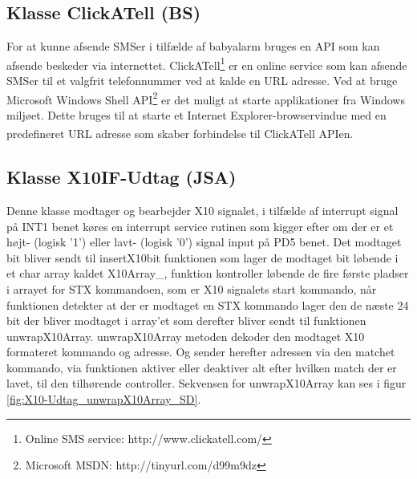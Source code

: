 \subsection{Klasse ClickATell (BS)}
For at kunne afsende SMSer i tilfælde af babyalarm bruges en API som kan afsende beskeder via internettet.
ClickATell\textsuperscript{\circledR}\footnote{Online SMS service: http://www.clickatell.com/} er en online service som kan afsende SMSer til et valgfrit telefonnummer ved at kalde en URL adresse.
Ved at bruge Microsoft Windows Shell API\footnote{Microsoft MSDN: http://tinyurl.com/d99m9dz} er det muligt at starte applikationer fra Windows miljøet. Dette bruges til at starte et Internet Explorer-browservindue med en predefineret URL adresse som skaber forbindelse til ClickATell\textsuperscript{\circledR} APIen. 

\subsection{Klasse X10IF-Udtag (JSA)}
Denne klasse modtager og bearbejder X10 signalet, i tilfælde af interrupt signal på INT1 benet køres en interrupt service rutinen som kigger efter om der er et højt- (logisk '1') eller lavt- (logisk '0') signal input på PD5 benet. Det modtaget bit bliver sendt til insertX10bit funktionen som lager de modtaget bit løbende i et char array kaldet X10Array\_, funktion kontroller løbende de fire første pladser i arrayet for STX kommandoen, som er X10 signalets start kommando, når funktionen detekter at der er modtaget en STX kommando lager den de næste 24 bit der bliver modtaget i array'et som derefter bliver sendt til funktionen unwrapX10Array. unwrapX10Array metoden dekoder den modtaget X10 formateret kommando og adresse. Og sender herefter adressen via den matchet kommando, via funktionen aktiver eller deaktiver alt efter hvilken match der er lavet, til den tilhørende controller.
Sekvensen for unwrapX10Array kan ses i figur \ref{fig:X10-Udtag_unwrapX10Array_SD}.

